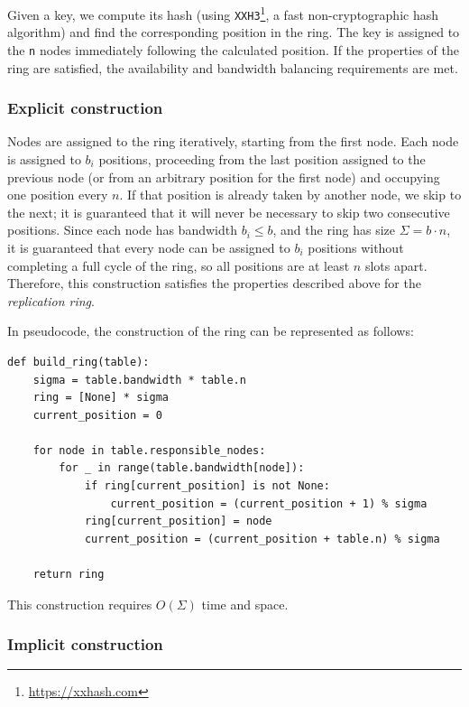 Given a key, we compute its hash (using \texttt{XXH3}\footnote{\url{https://xxhash.com}}, a fast non-cryptographic hash algorithm) and find the corresponding position in the ring.
The key is assigned to the \texttt{n} nodes immediately following the calculated position.
If the properties of the ring are satisfied, the availability and bandwidth balancing requirements are met.

\subsubsection{Explicit construction}
\label{subsubsec:explicit-construction}

Nodes are assigned to the ring iteratively, starting from the first node.
Each node is assigned to $b_i$ positions, proceeding from the last position assigned to the previous node (or from an arbitrary position for the first node) and occupying one position every $n$.
If that position is already taken by another node, we skip to the next; it is guaranteed that it will never be necessary to skip two consecutive positions.
Since each node has bandwidth $b_i \leq b$, and the ring has size $\Sigma = b \cdot n$, it is guaranteed that every node can be assigned to $b_i$ positions without completing a full cycle of the ring, so all positions are at least $n$ slots apart.
Therefore, this construction satisfies the properties described above for the \emph{replication ring}.

\begin{samepage}
    \noindent In pseudocode, the construction of the ring can be represented as follows:
    \begin{verbatim}
def build_ring(table):
    sigma = table.bandwidth * table.n
    ring = [None] * sigma
    current_position = 0

    for node in table.responsible_nodes:
        for _ in range(table.bandwidth[node]):
            if ring[current_position] is not None:
                current_position = (current_position + 1) % sigma
            ring[current_position] = node
            current_position = (current_position + table.n) % sigma

    return ring
    \end{verbatim}
\end{samepage}

This construction requires $O(\Sigma)$ time and space.

\subsubsection{Implicit construction}
\label{subsubsec:implicit-construction}

